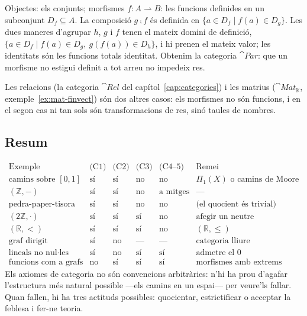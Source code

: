 \begin{exemple}
Objectes: els conjunts; morfismes $f\colon A\rightharpoonup B$: les funcions definides en un subconjunt $D_f\subseteq A$. La composició $g\comp f$ és definida en $\{a\in D_f\mid f(a)\in D_g\}$. Les dues maneres d'agrupar $h$, $g$ i $f$ tenen el mateix domini de definició, $\{a\in D_f\mid f(a)\in D_g,\ g(f(a))\in D_h\}$, i hi prenen el mateix valor; les identitats són les funcions totals identitat. Obtenim la categoria $\cat{Par}$: que un morfisme no estigui definit a tot arreu no impedeix res.
\end{exemple}

Les relacions (la categoria $\cat{Rel}$ del capítol~\ref{cap:categories}) i les matrius ($\cat{Mat}_{\mathbb K}$, exemple~\ref{ex:mat-finvect}) són dos altres casos: els morfismes no són funcions, i en el segon cas ni tan sols són transformacions de res, sinó taules de nombres.

\subsection{Resum}

\[
\renewcommand{\arraystretch}{1.15}
\begin{array}{lccccl}
\text{Exemple} & \text{(C1)} & \text{(C2)} & \text{(C3)} & \text{(C4--5)} & \text{Remei}\\\hline
\text{camins sobre }[0,1] & \text{sí} & \text{sí} & \text{no} & \text{no} & \Pi_1(X)\text{ o camins de Moore}\\
(\mathbb Z,-) & \text{sí} & \text{sí} & \text{no} & \text{a mitges} & \text{---}\\
\text{pedra-paper-tisora} & \text{sí} & \text{sí} & \text{no} & \text{no} & \text{(el quocient és trivial)}\\
(2\mathbb Z,\cdot) & \text{sí} & \text{sí} & \text{sí} & \text{no} & \text{afegir un neutre}\\
(\mathbb R,<) & \text{sí} & \text{sí} & \text{sí} & \text{no} & (\mathbb R,\le)\\
\text{graf dirigit} & \text{sí} & \text{no} & \text{---} & \text{---} & \text{categoria lliure}\\
\text{lineals no nul·les} & \text{sí} & \text{no} & \text{sí} & \text{sí} & \text{admetre el }0\\
\text{funcions com a grafs} & \text{no} & \text{sí} & \text{sí} & \text{sí} & \text{morfismes amb extrems}
\end{array}
\]
Els axiomes de categoria no són convencions arbitràries: n'hi ha prou d'agafar l'estructura més natural possible ---els camins en un espai--- per veure'ls fallar. Quan fallen, hi ha tres actituds possibles: quocientar, estrictificar o acceptar la feblesa i fer-ne teoria.

